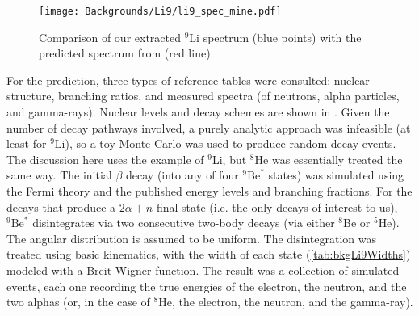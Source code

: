 \documentclass[../thesis.tex]{subfiles}
\begin{document}
\begin{figure}[h]
  \texttt{[image: Backgrounds/Li9/li9\_spec\_mine.pdf]}
  \caption{Comparison of our extracted $^9$Li spectrum (blue points) with the predicted spectrum from \cite{pedroLi9Spec1,pedroLi9Spec2} (red line).}
  \label{fig:li9_spec}
\end{figure}

\begin{comment}
An extraction of the spectrum from Daya Bay data was performed by Marshall in [YYY]. The approach takes advantage of the fact that \LiHe\ are essentially the only IBD-like events that are correlated with muons on the 100~ms timescale. A \LiHe-enriched sample was obtained by taking IBD-like events within 2---200~ms of a ``shower'' muon, here defined as one producing at least $2\times10^5$ photoelectrons. This sample contained various muon-uncorrelated ``backgrounds'', such as true IBDs and accidentals. In order to remove this contamination, a \LiHe-depleted sample was obtained by looking for IBD candidates with no preceding shower muons within 1.5~s. Before subtracting the two spectra, an appropriate normalization for the depleted sample had to be determined. This was done by performing the time-to-last-muon fit for the enriched sample, which indicated the number of true \LiHe\ events in the sample, in turn implying the number of non-\LiHe\ events. The depleted sample was thus normalized to this latter count, and the subtraction was performed, giving the results shown in Fig.~YYY.
\end{comment}

For the prediction, three types of reference tables were consulted: nuclear structure, branching ratios, and measured spectra (of neutrons, alpha particles, and gamma-rays). Nuclear levels and decay schemes are shown in . Given the number of decay pathways involved, a purely analytic approach was infeasible (at least for $^9$Li), so a toy Monte Carlo was used to produce random decay events. The discussion here uses the example of $^9$Li, but $^8$He was essentially treated the same way. The initial $\beta$ decay (into any of four $^9\mathrm{Be}^*$ states) was simulated using the Fermi theory \cite{Fermi1934TentativoDU} and the published energy levels and branching fractions. For the decays that produce a $2\alpha+n$ final state (i.e. the only decays of interest to us), $^9\mathrm{Be}^*$ disintegrates via two consecutive two-body decays (via either $^8$Be or $^5$He). The angular distribution is assumed to be uniform. The disintegration was treated using basic kinematics, with the width of each state (\autoref{tab:bkgLi9Widths}) modeled with a Breit-Wigner function. The result was a collection of simulated events, each one recording the true energies of the electron, the neutron, and the two alphas (or, in the case of $^8$He, the electron, the neutron, and the gamma-ray).
\end{document}
